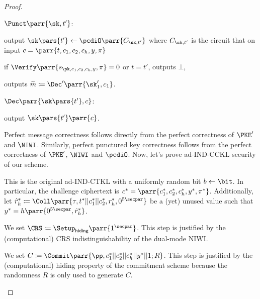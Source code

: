 \begin{proof}
\begin{sitemize}
        \item \(\Punct\parr{\sk,t'}\):
        \begin{sitemize}
            \item output \(\sk\pars{t'} \gets \pcdiO\parr{C_{\sk,t'}}\) where \(C_{\sk,t'}\) is the circuit that on input \(c = \parr{t,c_1,c_2,c_h,y,\pi}\)
            \begin{sitemize}
                \item if \(\Verify\parr{s_{\pk,c_1,c_2,c_h,y},\pi} = 0\) or \(t=t'\), outputs \(\bot\),
                \item outputs \(\widetilde{m} \coloneqq \Dec'\parr{\sk'_1,c_1}\).
            \end{sitemize}
        \end{sitemize}

        \item \(\Dec\parr{\sk\pars{t'},c}\):
        \begin{sitemize}
            \item output \(\sk\pars{t'}\parr{c}\).
        \end{sitemize}
    \end{sitemize}
    Perfect message correctness follows directly from the perfect correctness of \(\PKE'\) and \(\NIWI\).
    Similarly, perfect punctured key correctness follows from the perfect correctness of \(\PKE'\), \(\NIWI\) and \(\pcdiO\).
    Now, let's prove ad-IND-CCKL security of our scheme.
    \begin{hybrids}
        \item This is the original ad-IND-CTKL with a uniformly random bit \(b \gets \bit\).
        In particular, the challenge ciphertext is \(c^* = \parr{c^*_1,c^*_2,c^*_h,y^*,\pi^*}\).
        Additionally, let \(\hat{r}^*_h \coloneqq \Coll\parr{\tau,t^*||c^*_1||c^*_2,r^*_h,0^{5\secpar}}\) be a (yet) unused value such that \(y^* = h\parr{0^{5\secpar},\hat{r}^*_h}\).

        \item We set \(\CRS \coloneqq \Setup_{\textsf{hiding}}\parr{1^\secpar}\).
        This step is justified by the (computational) CRS indistinguishability of the dual-mode NIWI.

        \item We set \(C \coloneqq \Commit\parr{\pp,c^*_1||c^*_2||c^*_h||y^*||1;R}\).
        This step is justified by the (computational) hiding property of the commitment scheme because the randomness \(R\) is only used to generate \(C\).


\end{hybrids}
\end{proof}
